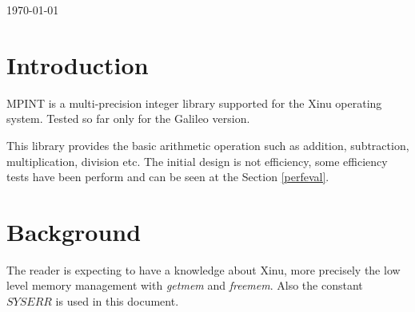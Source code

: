 \documentclass[10pt,a4paper]{article}
\begin{document}
\begin{titlepage}
    
    
    {\large \today}\\[1cm] %
    
    
    
    
  \end{titlepage}
  \restoregeometry
  
  
  \tableofcontents
  \newpage
  
  \section{Introduction}
  
  MPINT is a multi-precision integer library supported for the Xinu operating system. Tested so far only for the Galileo version.
  
  This library provides the basic arithmetic operation such as addition, subtraction, multiplication, division etc. The initial design is not efficiency,
  some efficiency tests have been perform and can be seen at the Section \ref{perfeval}.
  
  \section{Background}
  
  The reader is expecting to have a knowledge about Xinu, more precisely the low level memory management with \textit{getmem} and \textit{freemem}. Also
  the constant $SYSERR$ is used in this document.
  
\end{document}
